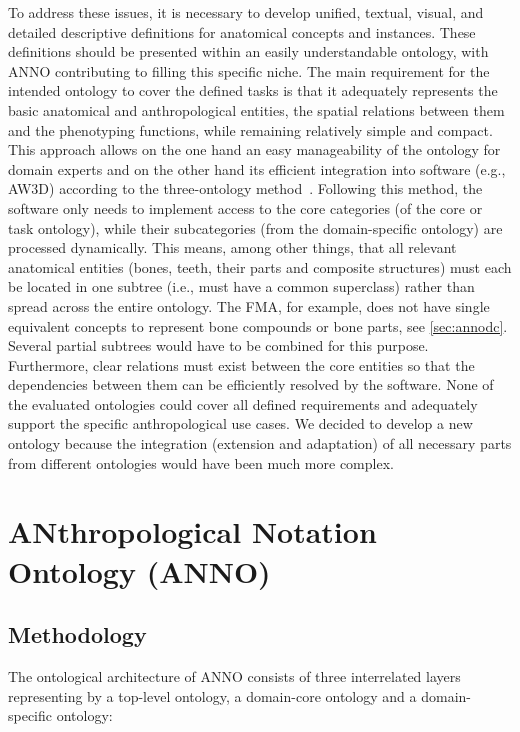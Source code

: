 \documentclass[sw]{iosart2x}
\begin{document}
To address these issues, it is necessary to develop unified, textual, visual, and detailed descriptive definitions for anatomical concepts and instances.
These definitions should be presented within an easily understandable ontology, with ANNO contributing to filling this specific niche.
%
The main requirement for the intended ontology to cover the defined tasks is that it adequately represents the basic anatomical and anthropological entities, the spatial relations between them and the phenotyping functions, while remaining relatively simple and compact.
This approach allows on the one hand an easy manageability of the ontology for domain experts and on the other hand its efficient integration into software (e.g., AW3D) according to the three-ontology method~\citep{threeontologymethod}.
Following this method, the software only needs to implement access to the core categories (of the core or task ontology), while their subcategories (from the domain-specific ontology) are processed dynamically.
This means, among other things, that all relevant anatomical entities (bones, teeth, their parts and composite structures) must each be located in one subtree (i.e., must have a common superclass) rather than spread across the entire ontology.
The FMA, for example, does not have single equivalent concepts to represent bone compounds or bone parts, see \cref{sec:annodc}.
Several partial subtrees would have to be combined for this purpose.
Furthermore, clear relations must exist between the core entities so that the dependencies between them can be efficiently resolved by the software.
None of the evaluated ontologies could cover all defined requirements and adequately support the specific anthropological use cases.
We decided to develop a new ontology because the integration (extension and adaptation) of all necessary parts from different ontologies would have been much more complex.

\section{ANthropological Notation Ontology (ANNO)}\label{sec:anno}

\subsection{Methodology}\label{sec:methodology}
The ontological architecture of ANNO consists of three interrelated layers representing by a top-level ontology, a domain-core ontology and a domain-specific ontology:
\end{document}
